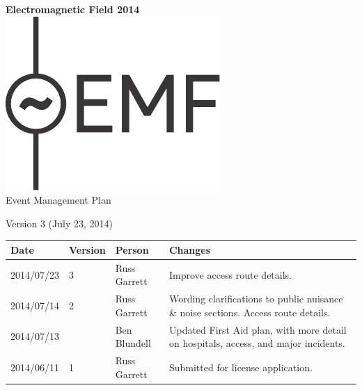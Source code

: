

\newcommand{\st}{\superscript{st} }
\newcommand{\nd}{\superscript{nd} }
\renewcommand{\th}{\superscript{th} }




\begin{titlepage}
\thispagestyle{empty}
\begin{center}
{\bf \LARGE Electromagnetic Field 2014}\\[36pt]
\includegraphics{emf-logo.pdf}\\[48pt]
{\Large Event Management Plan}

Version 3 (July 23, 2014)

\vfill

\begin{tabular}{l | l | l | p{10cm}}
  Date & Version & Person & Changes \\
  \hline
  2014/07/23 & 3 & Russ Garrett & Improve access route details. \\
  2014/07/14 & 2 & Russ Garrett & Wording clarifications to public nuisance \& noise sections. Access route details.  \\
  2014/07/13 &   & Ben Blundell & Updated First Aid plan, with more detail on hospitals, access, and major incidents. \\
  2014/06/11 & 1 & Russ Garrett & Submitted for license application. \\
\end{tabular}

\end{center}
\end{titlepage}

\tableofcontents

\newpage



